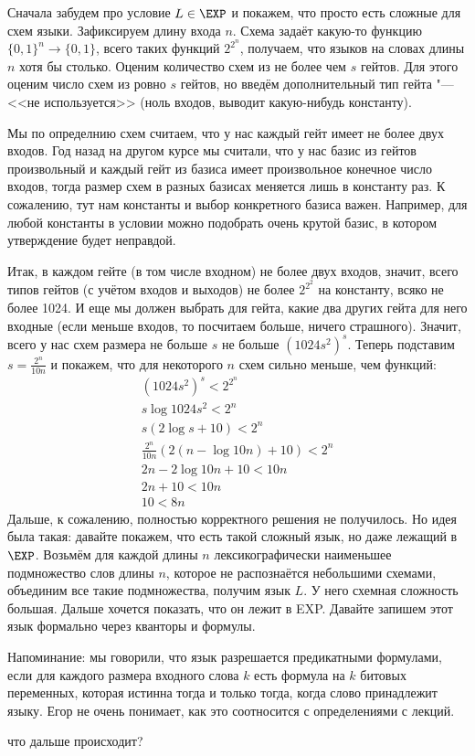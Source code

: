 	Сначала забудем про условие $L \in \EXP$ и покажем, что просто есть сложные для схем языки.
	Зафиксируем длину входа $n$.
	Схема задаёт какую-то функцию $\{0, 1\}^n \to \{0, 1\}$, всего таких функций $2^{2^n}$,
	получаем, что языков на словах длины $n$ хотя бы столько.
	Оценим количество схем из не более чем $s$ гейтов.
	Для этого оценим число схем из ровно $s$ гейтов, но введём дополнительный тип гейта "--- <<не используется>>
	(ноль входов, выводит какую-нибудь константу).
	\begin{Rem}
		Мы по определнию схем считаем, что у нас каждый гейт имеет не более двух входов.
		Год назад на другом курсе мы считали, что у нас базис из гейтов произвольный и каждый гейт
		из базиса имеет произвольное конечное число входов, тогда размер схем в разных базисах
		меняется лишь в константу раз.
		К сожалению, тут нам константы и выбор конкретного базиса важен.
		Например, для любой константы в условии можно подобрать очень крутой базис, в котором
		утверждение будет неправдой.
	\end{Rem}
	Итак, в каждом гейте (в том числе входном) не более двух входов, значит, всего типов гейтов
	(с учётом входов и выходов) не более $2^{2^2}$ на константу, всяко не более 1024.
	И еще мы должен выбрать для гейта, какие два других гейта для него входные
	(если меньше входов, то посчитаем больше, ничего страшного).
	Значит, всего у нас схем размера не больше $s$ не больше $(1024s^2)^s$.
	Теперь подставим $s=\frac{2^n}{10n}$ и покажем, что для некоторого $n$ схем сильно меньше, чем функций:
	\begin{gather*}
		(1024s^2)^s < 2^{2^n} \\
		s \log 1024s^2 < 2^n \\
		s (2\log s + 10) < 2^n \\
		\frac{2^n}{10n} (2(n-\log 10n) + 10) < 2^n \\
		2n-2\log 10n + 10 < 10n \\
		2n + 10 < 10n \\
		10 < 8n
	\end{gather*}
	Дальше, к сожалению, полностью корректного решения не получилось.
	Но идея была такая: 
	давайте покажем, что есть такой сложный язык, но даже лежащий в $\EXP$.
	Возьмём для каждой длины $n$ лексикографически наименьшее подмножество слов длины $n$,
	которое не распознаётся небольшими схемами, объединим все такие подмножества, получим язык $L$.
	У него схемная сложность большая.
	Дальше хочется показать, что он лежит в EXP.
	Давайте запишем этот язык формально через кванторы и формулы.
	\begin{Rem}
		Напоминание: мы говорили, что язык разрешается предикатными формулами, если
		для каждого размера входного слова $k$ есть формула на $k$ битовых переменных,
		которая истинна тогда и только тогда, когда слово принадлежит языку.
		\TODO Егор не очень понимает, как это соотносится с определениями с лекций.
	\end{Rem}
	\TODO что дальше происходит?


